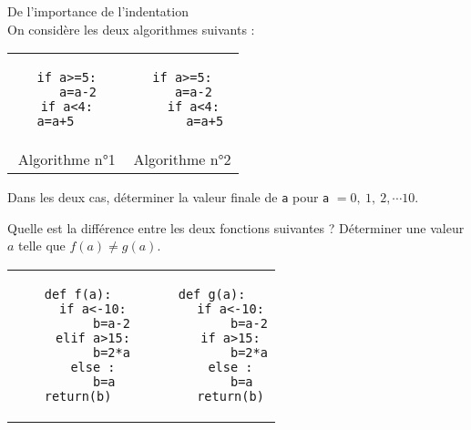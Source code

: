 \begin{exercice}De l'importance de l'indentation\\
On consid\` ere les deux algorithmes suivants :
\begin{center}
\begin{tabular}{cc}
\begin{minipage}{7cm}
\begin{verbatim}
if a>=5:
   a=a-2
if a<4:
   a=a+5      
\end{verbatim}
\end{minipage} &
\begin{minipage}{7cm}
\begin{verbatim}
if a>=5:
   a=a-2
   if a<4:
      a=a+5
\end{verbatim}        
\end{minipage}\\
Algorithme n°1&Algorithme n°2
\end{tabular}
\end{center}
Dans les deux cas, d\' eterminer la valeur finale de \verb?a? pour \verb?a? $= 0,\ 1,\ 2,\cdots 10$. 
\end{exercice}
\bigskip


\begin{exercice}
Quelle est la diff\' erence entre les deux fonctions suivantes ? D\' eterminer une valeur $a$ telle que $f(a)\neq g(a)$.
\begin{center}
\begin{tabular}{cc}
\begin{minipage}{7cm}
\begin{verbatim}
def f(a):
    if a<-10:
         b=a-2
    elif a>15:
         b=2*a
    else :
         b=a  
    return(b)    
\end{verbatim}
\end{minipage} &
\begin{minipage}{7cm}
\begin{verbatim}
def g(a):
     if a<-10:
          b=a-2
     if a>15:
          b=2*a
     else :
          b=a  
     return(b)
\end{verbatim}        
\end{minipage}
\end{tabular}
\end{center}
\end{exercice}
\bigskip



